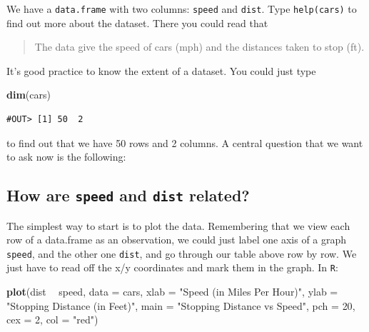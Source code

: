 \documentclass[]{book}
\newenvironment{Shaded}{\begin{snugshade}}{\end{snugshade}}
\newcommand{\KeywordTok}[1]{\textcolor[rgb]{0.13,0.29,0.53}{\textbf{#1}}}
\newcommand{\DataTypeTok}[1]{\textcolor[rgb]{0.13,0.29,0.53}{#1}}
\newcommand{\DecValTok}[1]{\textcolor[rgb]{0.00,0.00,0.81}{#1}}
\newcommand{\StringTok}[1]{\textcolor[rgb]{0.31,0.60,0.02}{#1}}
\newcommand{\OperatorTok}[1]{\textcolor[rgb]{0.81,0.36,0.00}{\textbf{#1}}}
\newcommand{\NormalTok}[1]{#1}
\theoremstyle{definition}
\theoremstyle{definition}
\theoremstyle{definition}
\theoremstyle{remark}
\begin{document}
We have a \texttt{data.frame} with two columns: \texttt{speed} and
\texttt{dist}. Type \texttt{help(cars)} to find out more about the
dataset. There you could read that

\begin{quote}
The data give the speed of cars (mph) and the distances taken to stop
(ft).
\end{quote}

It's good practice to know the extent of a dataset. You could just type

\begin{Shaded}
\begin{Highlighting}[]
\KeywordTok{dim}\NormalTok{(cars)}
\end{Highlighting}
\end{Shaded}

\begin{verbatim}
#OUT> [1] 50  2
\end{verbatim}

to find out that we have 50 rows and 2 columns. A central question that
we want to ask now is the following:

\subsection{\texorpdfstring{How are \texttt{speed} and \texttt{dist}
related?}{How are speed and dist related?}}\label{how-are-speed-and-dist-related}

The simplest way to start is to plot the data. Remembering that we view
each row of a data.frame as an observation, we could just label one axis
of a graph \texttt{speed}, and the other one \texttt{dist}, and go
through our table above row by row. We just have to read off the x/y
coordinates and mark them in the graph. In \texttt{R}:

\begin{Shaded}
\begin{Highlighting}[]
\KeywordTok{plot}\NormalTok{(dist }\OperatorTok{~}\StringTok{ }\NormalTok{speed, }\DataTypeTok{data =}\NormalTok{ cars,}
     \DataTypeTok{xlab =} \StringTok{"Speed (in Miles Per Hour)"}\NormalTok{,}
     \DataTypeTok{ylab =} \StringTok{"Stopping Distance (in Feet)"}\NormalTok{,}
     \DataTypeTok{main =} \StringTok{"Stopping Distance vs Speed"}\NormalTok{,}
     \DataTypeTok{pch  =} \DecValTok{20}\NormalTok{,}
     \DataTypeTok{cex  =} \DecValTok{2}\NormalTok{,}
     \DataTypeTok{col  =} \StringTok{"red"}\NormalTok{)}
\end{Highlighting}
\end{Shaded}
\end{document}
